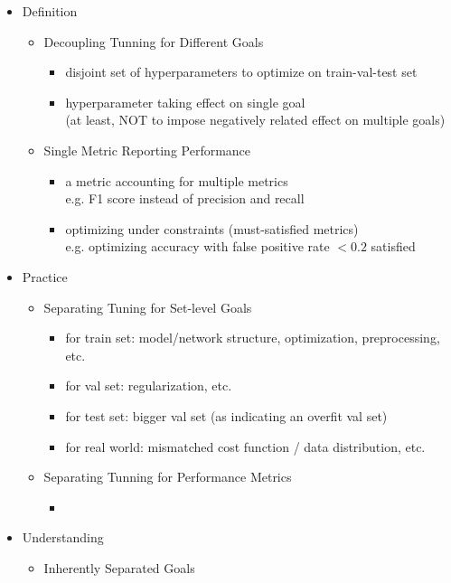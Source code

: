 \begin{itemize}
\item Definition
	\begin{itemize}
	\item Decoupling Tunning for Different Goals
		\begin{itemize}
		\item disjoint set of hyperparameters to optimize on train-val-test set
		\item hyperparameter taking effect on single goal \\
		(at least, NOT to impose negatively related effect on multiple goals)
		\end{itemize}
	\item Single Metric Reporting Performance
		\begin{itemize}
		\item a metric accounting for multiple metrics \\
		e.g. F1 score instead of precision and recall
		\item optimizing under constraints (must-satisfied metrics) \\
		e.g. optimizing accuracy with false positive rate $< 0.2$ satisfied
		\end{itemize}
	\end{itemize}
\item Practice
	\begin{itemize}
	\item Separating Tuning for Set-level Goals
		\begin{itemize}
		\item for train set: model/network structure, optimization, preprocessing, etc.
		\item for val set:  regularization, etc.
		\item for test set: bigger val set (as indicating an overfit val set)
		\item for real world: mismatched cost function / data distribution, etc.
		\end{itemize}	
	\item Separating Tunning for Performance Metrics
		\begin{itemize}
		\item 
		\end{itemize}
	\end{itemize}
\item Understanding
	\begin{itemize}
	\item Inherently Separated Goals
		\begin{itemize}

\end{itemize}
\end{itemize}
\end{itemize}
